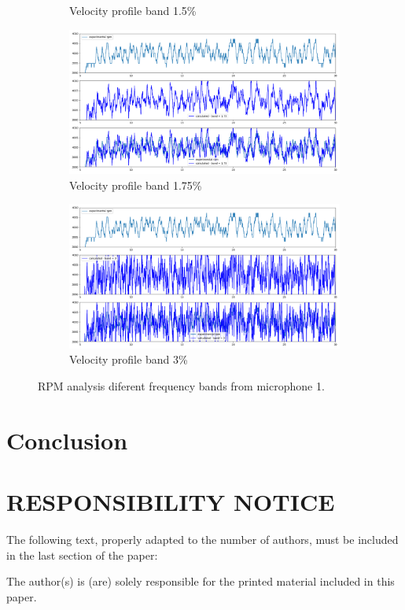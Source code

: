\documentclass[10pt,fleqn,a4paper,twoside]{article}
\begin{document}
\begin{figure}
\begin{subfigure}{0.4\textwidth}
        \caption{Velocity profile band 1.5\%}
        \label{fig:sixth}
    \end{subfigure}
    \centering
    \hfill
    \begin{subfigure}{0.4\textwidth}
        \includegraphics[width=\textwidth]{Figures/rpm_analysis_mic0_band_1.75.png}
        \caption{Velocity profile band 1.75\%}
        \label{fig:seventh}
    \end{subfigure}
    \centering
    \hfill 
    \begin{subfigure}{0.4\textwidth}
        \includegraphics[width=\textwidth]{Figures/rpm_analysis_mic0_band_3.png}
        \caption{Velocity profile band 3\%}
        \label{fig:eigth}
    \end{subfigure}
            
    \caption{RPM analysis diferent frequency bands from microphone 1.}
    \label{fig:figures}
    \end{figure}

\section{Conclusion}



\renewcommand{\refname}{}


\section{RESPONSIBILITY NOTICE}

The following text, properly adapted to the number of authors, must be included in the last section of the paper:

The author(s) is (are) solely responsible for the printed material included in this paper.
\end{document}
